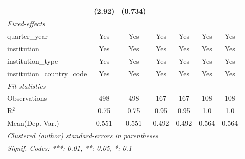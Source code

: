 \begin{tabular}{lcccccc}
                                         & (2.92)  & (0.734)      &                 &                &                &   \\   
   \midrule
   \emph{Fixed-effects}\\
   quarter\_year                         & Yes     & Yes          & Yes             & Yes            & Yes            & Yes\\  
   institution                           & Yes     & Yes          & Yes             & Yes            & Yes            & Yes\\  
   institution\_type                     & Yes     & Yes          & Yes             & Yes            & Yes            & Yes\\  
   institution\_country\_code            & Yes     & Yes          & Yes             & Yes            & Yes            & Yes\\  
   \midrule
   \emph{Fit statistics}\\
   Observations                          & 498     & 498          & 167             & 167            & 108            & 108\\  
   R$^2$                                 & 0.75    & 0.75         & 0.95            & 0.95           & 1.0            & 1.0\\  
Mean(Dep. Var.) & 0.551 & 0.551 & 0.492 & 0.492 & 0.564 & 0.564 \\
   \midrule \midrule
   \multicolumn{7}{l}{\emph{Clustered (author) standard-errors in parentheses}}\\
   \multicolumn{7}{l}{\emph{Signif. Codes: ***: 0.01, **: 0.05, *: 0.1}}\\
\end{tabular}
\par\endgroup

